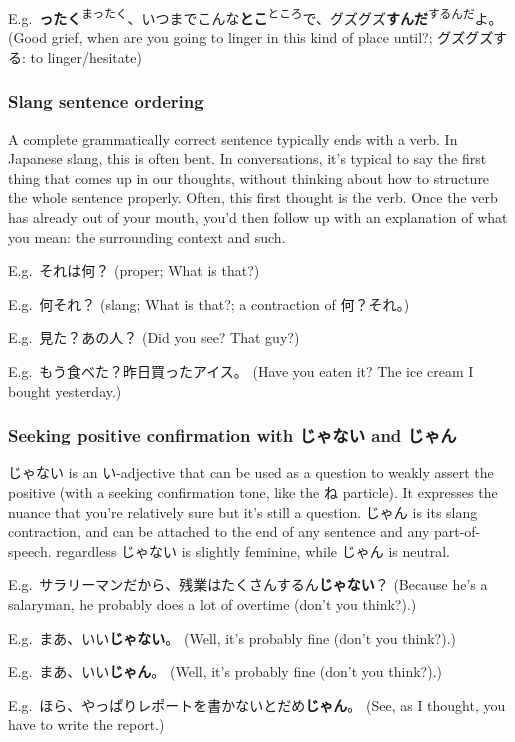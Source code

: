 \documentclass[../nihongo-gakushuu-kyouzai-grammar.tex]{subfiles}
\begin{document}
E.g.\ \textbf{ったく}\textsuperscript{まったく}、いつまでこんな\textbf{とこ}\textsuperscript{ところ}で、グズグズ\textbf{すんだ}\textsuperscript{するんだ}よ。 (Good grief, when are you going to linger in this kind of place until?; グズグズする: to linger/hesitate)


\subsubsection{Slang sentence ordering} \label{sec:slang-sentence-ordering}
A complete grammatically correct sentence typically ends with a verb. In Japanese slang, this is often bent. In conversations, it's typical to say the first thing that comes up in our thoughts, without thinking about how to structure the whole sentence properly. Often, this first thought is the verb. Once the verb has already out of your mouth, you'd then follow up with an explanation of what you mean: the surrounding context and such.

E.g.\ それは何？ (proper; What is that?)

E.g.\ 何それ？ (slang; What is that?; a contraction of 何？それ。)

E.g.\ 見た？あの人？ (Did you see? That guy?)

E.g.\ もう食べた？昨日買ったアイス。 (Have you eaten it? The ice cream I bought yesterday.)


\subsubsection{Seeking positive confirmation with じゃない and じゃん} \label{seeking-positive-confirmation-with-janai-jann}
じゃない is an い-adjective that can be used as a question to weakly assert the positive (with a seeking confirmation tone, like the ね particle). It expresses the nuance that you're relatively sure but it's still a question. じゃん is its slang contraction, and can be attached to the end of any sentence and any part-of-speech. regardless  じゃない is slightly feminine, while じゃん is neutral.

E.g.\ サラリーマンだから、残業はたくさんするん\textbf{じゃない}？ (Because he's a salaryman, he probably does a lot of overtime (don't you think?).)

E.g.\ まあ、いい\textbf{じゃない}。 (Well, it's probably fine (don't you think?).)

E.g.\ まあ、いい\textbf{じゃん}。 (Well, it's probably fine (don't you think?).)

E.g.\ ほら、やっぱりレポートを書かないとだめ\textbf{じゃん}。 (See, as I thought, you have to write the report.)
\end{document}
